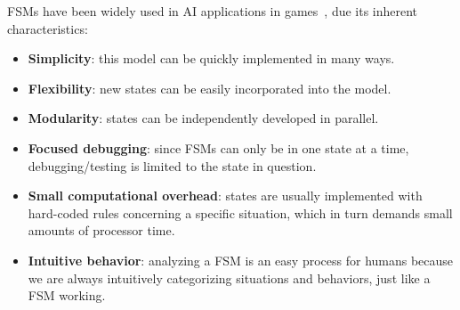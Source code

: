 FSMs have been widely used in AI applications in games~\cite{millington_2009}, due 
its inherent characteristics:

\begin{itemize}
	\item \textbf{Simplicity}: this model can be quickly implemented in many ways.
	
	\item \textbf{Flexibility}: new states can be easily incorporated into the model.
	
	\item \textbf{Modularity}: states can be independently developed in parallel.
	
	\item \textbf{Focused debugging}: since FSMs can only be in one state at a time,
	debugging/testing is limited to the state in question.
	
	\item \textbf{Small computational overhead}: states are usually implemented 
	with hard-coded rules concerning a specific situation, which in turn demands
	small amounts of processor time.
	
	\item \textbf{Intuitive behavior}: analyzing a FSM is an easy process for 
	humans because we are always intuitively categorizing situations and behaviors,
	just like a FSM working. 
\end{itemize}